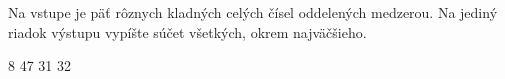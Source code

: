




Na vstupe je päť rôznych kladných celých čísel oddelených medzerou. Na jediný riadok výstupu vypíšte
súčet všetkých, okrem najväčšieho.

 8 47 31 32 
\koniec



